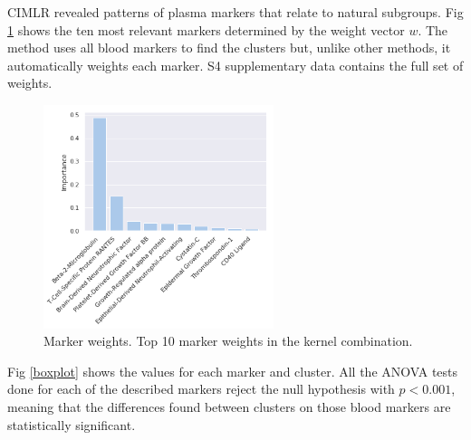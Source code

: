 CIMLR revealed patterns of plasma markers that relate to natural subgroups. Fig \ref{markers_imp} shows the ten most relevant markers determined by the weight vector $w$. The method uses all blood markers to find the clusters but, unlike other methods, it automatically weights each marker. S4 supplementary data contains the full set of weights.   \\

\begin{figure}[!htbp]
\centering
\includegraphics[width=0.6\textwidth]{figures/cimlr/cluster_importance.png}
\caption[Marker weights.]{Marker weights. Top 10 marker weights in the kernel combination.}
\label{markers_imp}
\end{figure}

Fig \ref{boxplot} shows the values for each marker and cluster. All the ANOVA tests done for each of the described markers reject the null hypothesis with $p<0.001$, meaning that the differences found between clusters on those blood markers are statistically significant.  \\


